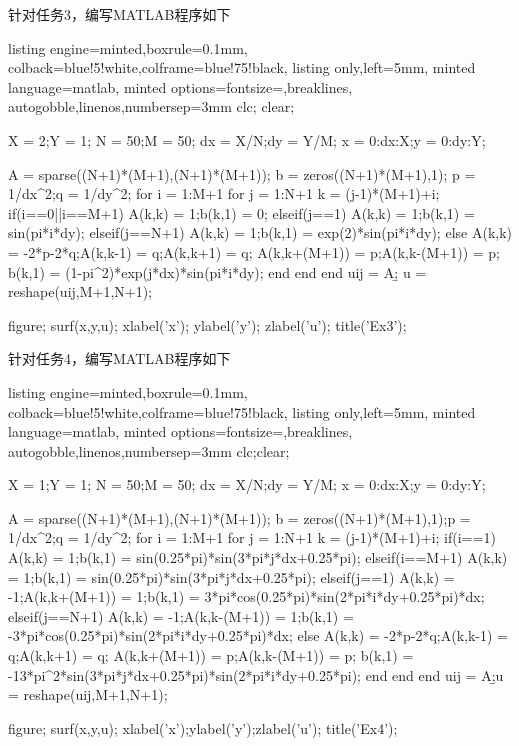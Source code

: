 \documentclass[12pt]{article}
\begin{document}
\newpage
针对任务3，编写MATLAB程序如下
\begin{tcblisting}{listing engine=minted,boxrule=0.1mm,
    colback=blue!5!white,colframe=blue!75!black,
    listing only,left=5mm,
    minted language=matlab,
    minted options={fontsize=\small,breaklines, autogobble,linenos,numbersep=3mm}}
clc;
clear;

X = 2;Y = 1;
N = 50;M = 50;
dx = X/N;dy = Y/M;
x = 0:dx:X;y = 0:dy:Y;

A = sparse((N+1)*(M+1),(N+1)*(M+1));
b = zeros((N+1)*(M+1),1);
p = 1/dx^2;q = 1/dy^2;
for i = 1:M+1
    for j = 1:N+1
        k = (j-1)*(M+1)+i;
        if(i==0||i==M+1)
            A(k,k) = 1;b(k,1) = 0;
        elseif(j==1)
            A(k,k) = 1;b(k,1) = sin(pi*i*dy);
        elseif(j==N+1)
            A(k,k) = 1;b(k,1) = exp(2)*sin(pi*i*dy);
        else
            A(k,k) = -2*p-2*q;A(k,k-1) = q;A(k,k+1) = q;
            A(k,k+(M+1)) = p;A(k,k-(M+1)) = p;
            b(k,1) = (1-pi^2)*exp(j*dx)*sin(pi*i*dy);
        end
    end 
end    
uij = A\b;
u = reshape(uij,M+1,N+1);

figure;
surf(x,y,u);
xlabel('x');
ylabel('y');
zlabel('u');
title('Ex3');
\end{tcblisting}

\newpage
针对任务4，编写MATLAB程序如下
\begin{tcblisting}{listing engine=minted,boxrule=0.1mm,
    colback=blue!5!white,colframe=blue!75!black,
    listing only,left=5mm,
    minted language=matlab,
    minted options={fontsize=\small,breaklines, autogobble,linenos,numbersep=3mm}}
clc;clear;

X = 1;Y = 1;
N = 50;M = 50;
dx = X/N;dy = Y/M;
x = 0:dx:X;y = 0:dy:Y;

A = sparse((N+1)*(M+1),(N+1)*(M+1));
b = zeros((N+1)*(M+1),1);p = 1/dx^2;q = 1/dy^2;
for i = 1:M+1
    for j = 1:N+1
    k = (j-1)*(M+1)+i;
        if(i==1)
            A(k,k) = 1;b(k,1) = sin(0.25*pi)*sin(3*pi*j*dx+0.25*pi);
        elseif(i==M+1)
            A(k,k) = 1;b(k,1) = sin(0.25*pi)*sin(3*pi*j*dx+0.25*pi);
        elseif(j==1)
            A(k,k) = -1;A(k,k+(M+1)) = 1;b(k,1) = 3*pi*cos(0.25*pi)*sin(2*pi*i*dy+0.25*pi)*dx;
        elseif(j==N+1)
            A(k,k) = -1;A(k,k-(M+1)) = 1;b(k,1) = -3*pi*cos(0.25*pi)*sin(2*pi*i*dy+0.25*pi)*dx;
        else
            A(k,k) = -2*p-2*q;A(k,k-1) = q;A(k,k+1) = q;
            A(k,k+(M+1)) = p;A(k,k-(M+1)) = p;
            b(k,1) = -13*pi^2*sin(3*pi*j*dx+0.25*pi)*sin(2*pi*i*dy+0.25*pi);
        end
    end 
end
uij = A\b;u = reshape(uij,M+1,N+1);

figure;
surf(x,y,u);
xlabel('x');ylabel('y');zlabel('u');
title('Ex4');
\end{tcblisting}
\end{document}
